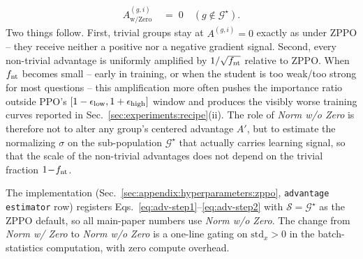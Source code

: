 \begin{itemize}[leftmargin=12pt,topsep=2pt,itemsep=2pt]
\begin{align}
  A^{(g,i)}_{\text{w/Zero}}
    &\;=\; 0 \quad (g\notin\mathcal{G}^{\star}).
  \label{eq:wzero-amplify}
  \end{align}
  Two things follow. First, trivial groups stay at $A^{(g,i)}\!=\!0$ exactly as under ZPPO -- they receive neither a positive nor a negative gradient signal. Second, every non-trivial advantage is uniformly amplified by $1/\sqrt{f_{\rm nt}}$ relative to ZPPO. When $f_{\rm nt}$ becomes small -- early in training, or when the student is too weak/too strong for most questions -- this amplification more often pushes the importance ratio outside PPO's $[1-\epsilon_{\rm low},1+\epsilon_{\rm high}]$ window and produces the visibly worse training curves reported in Sec.~\ref{sec:experiments:recipe}(ii). The role of \emph{Norm w/o Zero} is therefore not to alter any group's centered advantage $A'$, but to estimate the normalizing $\sigma$ on the sub-population $\mathcal{G}^{\star}$ that actually carries learning signal, so that the scale of the non-trivial advantages does not depend on the trivial fraction $1\!-\!f_{\rm nt}$.
\end{itemize}
The implementation (Sec.~\ref{sec:appendix:hyperparameters:zppo}, \texttt{advantage estimator} row) registers Eqs.~\eqref{eq:adv-step1}--\eqref{eq:adv-step2} with $\mathcal{S}\!=\!\mathcal{G}^{\star}$ as the ZPPO default, so all main-paper numbers use \emph{Norm w/o Zero}. The change from \emph{Norm w/ Zero} to \emph{Norm w/o Zero} is a one-line gating on $\mathrm{std}_x\!>\!0$ in the batch-statistics computation, with zero compute overhead.
